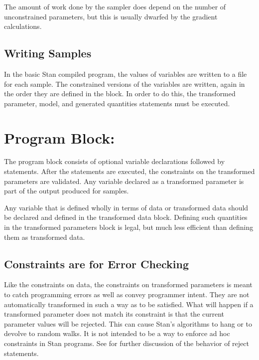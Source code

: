 The amount of work done by the sampler does depend on the number of
unconstrained parameters, but this is usually dwarfed by the gradient
calculations.

\subsection{Writing Samples}

In the basic Stan compiled program, the values of variables are
written to a file for each sample.  The constrained versions of the
variables are written, again in the order they are defined in the
 block.  In order to do this, the transformed
parameter, model, and generated quantities statements must be
executed.


\section{Program Block: }

The  program block consists of optional
variable declarations followed by statements.  After the statements
are executed, the constraints on the transformed parameters are
validated.  Any variable declared as a transformed parameter is part
of the output produced for samples.

Any variable that is defined wholly in terms of data or transformed
data should be declared and defined in the transformed data block.
Defining such quantities in the transformed parameters block is legal,
but much less efficient than defining them as transformed data.

\subsection{Constraints are for Error Checking}

Like the constraints on data, the constraints on transformed
parameters is meant to catch programming errors as well as convey
programmer intent.  They are not automatically transformed in such a
way as to be satisfied.  What will happen if a transformed parameter
does not match its constraint is that the current parameter values
will be rejected.  This can cause Stan's algorithms to hang or
to devolve to random walks.  It is not intended to be a way to enforce
ad hoc constraints in Stan programs.   See 
for further discussion of the behavior of reject statements.



